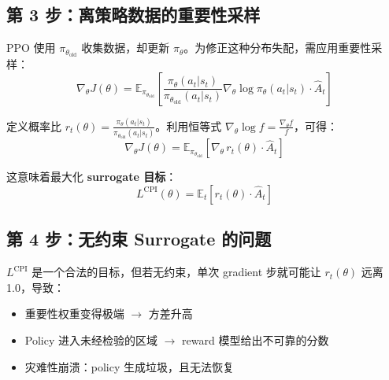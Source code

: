 \subsection{第 3 步：离策略数据的重要性采样}
\label{step-3-importance-sampling-for-off-policy-data}

PPO 使用 $\pi_{\theta_{\text{old}}}$ 收集数据，却更新 $\pi_\theta$。为修正这种分布失配，需应用重要性采样：
\begin{equation}
\nabla_\theta J(\theta) = \mathbb{E}_{\pi_{\theta_{\text{old}}}}\left[\frac{\pi_\theta(a_t|s_t)}{\pi_{\theta_{\text{old}}}(a_t|s_t)} \nabla_\theta \log \pi_\theta(a_t|s_t) \cdot \hat{A}_t\right]
\end{equation}

定义概率比 $r_t(\theta) = \frac{\pi_\theta(a_t|s_t)}{\pi_{\theta_{\text{old}}}(a_t|s_t)}$。利用恒等式 $\nabla_\theta \log f = \frac{\nabla_\theta f}{f}$，可得：
\begin{equation}
\nabla_\theta J(\theta) = \mathbb{E}_{\pi_{\theta_{\text{old}}}}\left[\nabla_\theta\, r_t(\theta) \cdot \hat{A}_t\right]
\end{equation}

这意味着最大化\textbf{ surrogate 目标}：
\begin{equation}
L^{\text{CPI}}(\theta) = \mathbb{E}_t\left[r_t(\theta) \cdot \hat{A}_t\right]
\end{equation}

\subsection{第 4 步：无约束 Surrogate 的问题}
\label{step-4-the-problem-with-unconstrained-surrogates}

$L^{\text{CPI}}$ 是一个合法的目标，但若无约束，单次 gradient 步就可能让 $r_t(\theta)$ 远离 1.0，导致：

\begin{itemize}
  \item 重要性权重变得极端 $\rightarrow$ 方差升高
  \item Policy 进入未经检验的区域 $\rightarrow$ reward 模型给出不可靠的分数
  \item 灾难性崩溃：policy 生成垃圾，且无法恢复
\end{itemize}

